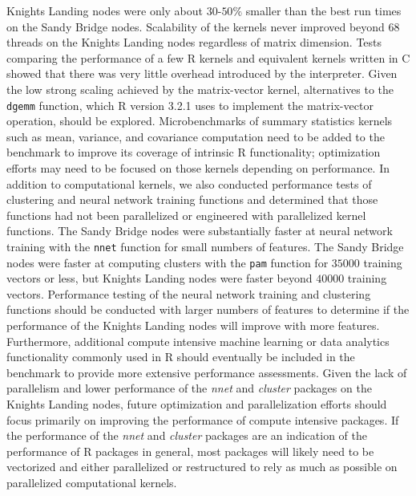   Knights Landing nodes were only about $30$-$50\%$ smaller than the best run
  times on the Sandy Bridge nodes.
Scalability of the kernels never improved beyond $68$ threads on the Knights
  Landing nodes regardless of matrix dimension.
Tests comparing the performance of a few R kernels and equivalent kernels
  written in C showed that there was very little overhead introduced by the
  interpreter.
Given the low strong scaling achieved by the matrix-vector kernel, alternatives
  to the \texttt{dgemm} function, which R version 3.2.1 uses to implement the
  matrix-vector operation, should be explored.
Microbenchmarks of summary statistics kernels such as mean, variance, and
  covariance computation need to be added to the benchmark to improve its
  coverage of intrinsic R functionality; optimization efforts may need to be
  focused on those kernels depending on performance.
In addition to computational kernels, we also conducted performance tests of
  clustering and neural network training functions and determined that those
  functions had not been parallelized or engineered with parallelized kernel
  functions.
The Sandy Bridge nodes were substantially faster at neural network training with
  the \texttt{nnet} function for small numbers of features.
The Sandy Bridge nodes were faster at computing clusters with the \texttt{pam}
  function for $35000$ training vectors or less, but Knights Landing nodes were
  faster beyond $40000$ training vectors.
Performance testing of the neural network training and clustering functions
  should be conducted with larger numbers of features to determine if the
  performance of the Knights Landing nodes will improve with more features.
Furthermore, additional compute intensive machine learning or data analytics
  functionality commonly used in R should eventually be included in the
  benchmark to provide more extensive performance assessments.
Given the lack of parallelism and lower performance of the \textit{nnet} and
  \textit{cluster} packages on the Knights Landing nodes, future optimization
  and parallelization efforts should focus primarily on improving the
  performance of compute intensive packages.
If the performance of the \textit{nnet} and \textit{cluster} packages are an
  indication of the performance of R packages in general, most packages will
  likely need to be vectorized and either parallelized or restructured to rely
  as much as possible on parallelized computational kernels.

%
%

